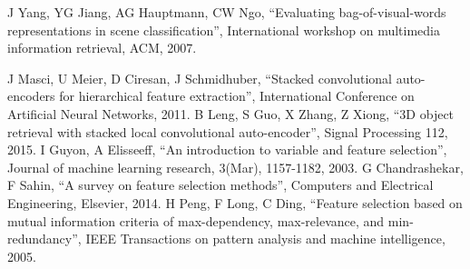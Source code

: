 \documentclass[letterpaper, 10 pt, conference]{ieeeconf}  %
\begin{document}
\begin{thebibliography}{99}
J Yang, YG Jiang, AG Hauptmann, CW Ngo, ``Evaluating bag-of-visual-words representations in scene classification'', International workshop on multimedia information retrieval, ACM, 2007.

J Masci, U Meier, D Ciresan, J Schmidhuber, ``Stacked convolutional auto-encoders for hierarchical feature extraction'', International Conference on Artificial Neural Networks, 2011.
B Leng, S Guo, X Zhang, Z Xiong, ``3D object retrieval with stacked local convolutional auto-encoder'', Signal Processing 112, 2015.
I Guyon, A Elisseeff, ``An introduction to variable and feature selection'', Journal of machine learning research, 3(Mar), 1157-1182, 2003.
G Chandrashekar, F Sahin, ``A survey on feature selection methods'', Computers and Electrical Engineering, Elsevier,  2014.
H Peng, F Long, C Ding, ``Feature selection based on mutual information criteria of max-dependency, max-relevance, and min-redundancy'', IEEE Transactions on pattern analysis and machine intelligence, 2005.



\end{thebibliography}
\end{document}
